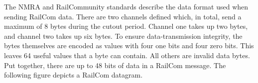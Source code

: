 \begin{center}
\end{center}

The NMRA and RailCommunity standards describe the data format used when sending RailCom data. There are two channels defined which, in total, send a maximum of 8 bytes during the cutout period. Channel one takes up two bytes, and channel two takes up six bytes. To ensure data-transmission integrity, the bytes themselves are encoded as values with four one bits and four zero bits. This leaves 64 useful values that a byte can contain. All others are invalid data bytes. Put together, there are up to 48 bits of data in a RailCom message. The following figure depicts a RailCom datagram.

